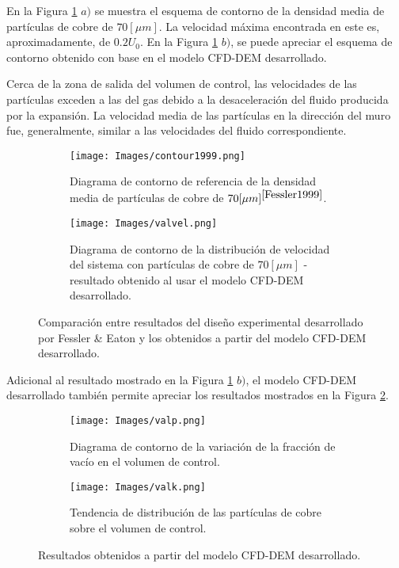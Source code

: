 \noindent
\justify

En la Figura \ref{resul1999} $a)$ se muestra el esquema de contorno de la densidad media de part\'iculas de cobre de $70 [\mu m]$. La velocidad m\'axima encontrada en este es, aproximadamente, de $0.2 U_0$. En la Figura \ref{resul1999} $b)$, se puede apreciar el esquema de contorno obtenido con base en el modelo CFD-DEM desarrollado.

\noindent
\justify

Cerca de la zona de salida del volumen de control, las velocidades de las part\'iculas exceden a las del gas debido a la desaceleraci\'on del fluido producida por la expansi\'on. La velocidad media de las part\'iculas en la direcci\'on del muro fue, generalmente, similar a las velocidades del fluido correspondiente.


\newpage

\begin{figure}[h!]
	\centering
	\begin{subfigure}[b]{\textwidth}
		\centering
		\texttt{[image: Images/contour1999.png]}
		\caption{Diagrama de contorno de referencia de la densidad media de part\'iculas de cobre de $70 [\mu m]^{\cite{Fessler1999}}$.}
	\end{subfigure}
	\hfill
	\begin{subfigure}[b]{\textwidth}
		\centering
		\texttt{[image: Images/valvel.png]}
		\caption{Diagrama de contorno de la distribuci\'on de velocidad del sistema con part\'iculas de cobre de $70 [\mu m]$ - resultado obtenido al usar el modelo CFD-DEM desarrollado.}
	\end{subfigure}
	\caption{Comparaci\'on entre resultados del dise\~no experimental desarrollado por Fessler \& Eaton y los obtenidos a partir del modelo CFD-DEM desarrollado.}
	\label{resul1999}
\end{figure}

\noindent
\justify

Adicional al resultado mostrado en la Figura \ref{resul1999} $b)$, el modelo CFD-DEM desarrollado tambi\'en permite apreciar los resultados mostrados en la Figura \ref{valrel}.

\begin{figure}[h!]
	\centering
	\begin{subfigure}[b]{\textwidth}
		\centering
		\texttt{[image: Images/valp.png]}
		\caption{Diagrama de contorno de la variaci\'on de la fracci\'on de vac\'io en el volumen de control.}
	\end{subfigure}
	\hfill
	\begin{subfigure}[b]{\textwidth}
		\centering
		\texttt{[image: Images/valk.png]}
		\caption{Tendencia de distribuci\'on de las part\'iculas de cobre sobre el volumen de control.}
	\end{subfigure}
	\caption{Resultados obtenidos a partir del modelo CFD-DEM desarrollado.}
	\label{valrel}
\end{figure}

